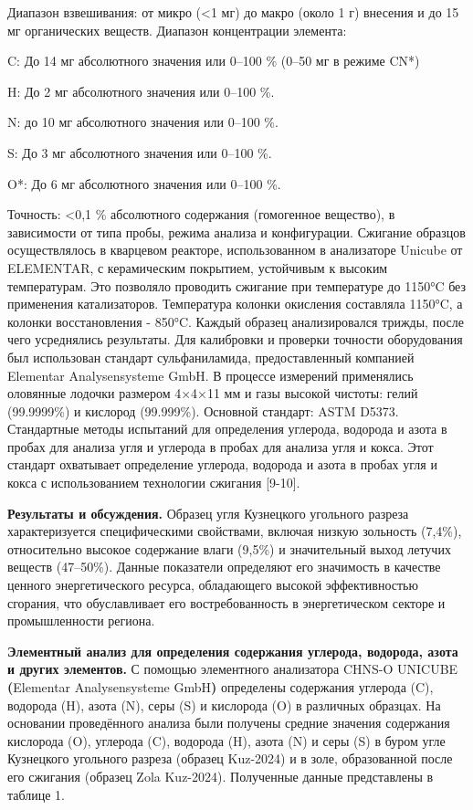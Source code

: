\begin{multicols}{2}
Диапазон взвешивания: от микро (\textless1 мг) до макро (около 1 г)
внесения и до 15 мг органических веществ. Диапазон концентрации
элемента:

C: До 14 мг абсолютного значения или 0--100 \% (0--50 мг в режиме CN*)

H: До 2 мг абсолютного значения или 0--100 \%.

N: до 10 мг абсолютного значения или 0--100 \%.

S: До 3 мг абсолютного значения или 0--100 \%.

O*: До 6 мг абсолютного значения или 0--100 \%.

Точность: \textless0,1 \% абсолютного содержания (гомогенное вещество),
в зависимости от типа пробы, режима анализа и конфигурации. Сжигание
образцов осуществлялось в кварцевом реакторе, использованном в
анализаторе Unicube от ELEMENTAR, с керамическим покрытием, устойчивым к
высоким температурам. Это позволяло проводить сжигание при температуре
до 1150°C без применения катализаторов. Температура колонки окисления
составляла 1150°C, а колонки восстановления - 850°C. Каждый образец
анализировался трижды, после чего усреднялись результаты. Для калибровки
и проверки точности оборудования был использован стандарт
сульфаниламида, предоставленный компанией Elementar Analysensysteme
GmbH. В процессе измерений применялись оловянные лодочки размером 4×4×11
мм и газы высокой чистоты: гелий (99.9999\%) и кислород (99.999\%).
Основной стандарт: ASTM D5373. Стандартные методы испытаний для
определения углерода, водорода и азота в пробах для анализа угля и
углерода в пробах для анализа угля и кокса. Этот стандарт охватывает
определение углерода, водорода и азота в пробах угля и кокса с
использованием технологии сжигания {[}9-10{]}.

{\bfseries Результаты и обсуждения.} Образец угля Кузнецкого угольного
разреза характеризуется специфическими свойствами, включая низкую
зольность (7,4\%), относительно высокое содержание влаги (9,5\%) и
значительный выход летучих веществ (47--50\%). Данные показатели
определяют его значимость в качестве ценного энергетического ресурса,
обладающего высокой эффективностью сгорания, что обуславливает его
востребованность в энергетическом секторе и промышленности региона.

{\bfseries Элементный анализ для определения содержания углерода, водорода,
азота и других элементов.} С помощью элементного анализатора CHNS-O
UNICUBE {\bfseries (}Elementar Analysensysteme GmbH{\bfseries )} определены
содержания углерода (C), водорода (H), азота (N), серы (S) и кислорода
(O) в различных образцах. На основании проведённого анализа были
получены средние значения содержания кислорода (O), углерода (C),
водорода (H), азота (N) и серы (S) в буром угле Кузнецкого угольного
разреза (образец Kuz-2024) и в золе, образованной после его сжигания
(образец Zola Kuz-2024). Полученные данные представлены в таблице 1.
\end{multicols}

